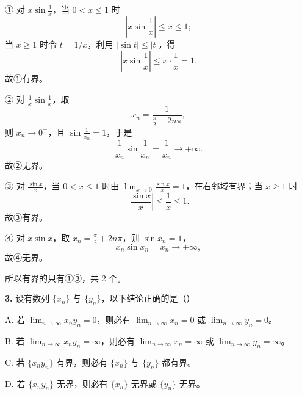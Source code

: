 \begin{solutionblock}

① 对 \(x\sin\frac1x\)，当 \(0<x\le 1\) 时
\[
\left|x\sin\frac1x\right|\le x\le 1;
\]
当 \(x\ge1\) 时令 \(t=1/x\)，利用 \(|\sin t|\le |t|\)，得
\[
\left|x\sin\frac1x\right|\le x\cdot\frac1x=1.
\]
故①有界。

② 对 \(\frac1x\sin\frac1x\)，取
\[
x_n=\frac{1}{\frac{\pi}{2}+2n\pi},
\]
则 \(x_n\to0^+\)，且 \(\sin\frac1{x_n}=1\)，于是
\[
\frac1{x_n}\sin\frac1{x_n}=\frac1{x_n}\to+\infty.
\]
故②无界。

③ 对 \(\frac{\sin x}{x}\)，当 \(0<x\le1\) 时由 \(\lim_{x\to0}\frac{\sin x}{x}=1\)，在右邻域有界；当 \(x\ge1\) 时
\[
\left|\frac{\sin x}{x}\right|\le \frac1x\le1.
\]
故③有界。

④ 对 \(x\sin x\)，取 \(x_n=\frac{\pi}{2}+2n\pi\)，则 \(\sin x_n=1\)，
\[
x_n\sin x_n=x_n\to+\infty,
\]
故④无界。

所以有界的只有①③，共 2 个。

\end{solutionblock}

\begin{problemblock}
\textbf{3.} 设有数列 \(\{x_n\}\) 与 \(\{y_n\}\)，以下结论正确的是（\quad）

A. 若 \(\lim_{n\to\infty}x_ny_n=0\)，则必有 \(\lim_{n\to\infty}x_n=0\) 或 \(\lim_{n\to\infty}y_n=0\)。

B. 若 \(\lim_{n\to\infty}x_ny_n=\infty\)，则必有 \(\lim_{n\to\infty}x_n=\infty\) 或 \(\lim_{n\to\infty}y_n=\infty\)。

C. 若 \(\{x_ny_n\}\) 有界，则必有 \(\{x_n\}\) 与 \(\{y_n\}\) 都有界。

D. 若 \(\{x_ny_n\}\) 无界，则必有 \(\{x_n\}\) 无界或 \(\{y_n\}\) 无界。
\end{problemblock}

